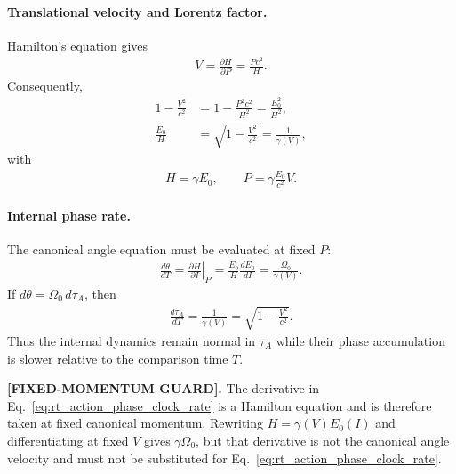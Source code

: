\paragraph{Translational velocity and Lorentz factor.}
Hamilton's equation gives
\begin{align}
    V
    =
    \frac{\partial H}{\partial P}
    =
    \frac{Pc^2}{H}.
    \label{eq:rt_action_phase_velocity}
\end{align}
Consequently,
\begin{align}
    1-\frac{V^2}{c^2}
    &=
    1-\frac{P^2c^2}{H^2}
    =
    \frac{E_0^2}{H^2},
    \\
    \frac{E_0}{H}
    &=
    \sqrt{1-\frac{V^2}{c^2}}
    =
    \frac{1}{\gamma(V)},
    \label{eq:rt_action_phase_e0_over_h}
\end{align}
with
\begin{align}
    H=\gamma E_0,
    \qquad
    P=\gamma\frac{E_0}{c^2}V.
    \label{eq:rt_action_phase_relativistic_relations}
\end{align}

\paragraph{Internal phase rate.}
The canonical angle equation must be evaluated at fixed \(P\):
\begin{align}
    \frac{d\theta}{dT}
    =
    \left.\frac{\partial H}{\partial I}\right|_P
    =
    \frac{E_0}{H}\frac{dE_0}{dI}
    =
    \frac{\Omega_0}{\gamma(V)}.
    \label{eq:rt_action_phase_clock_rate}
\end{align}
If \(d\theta=\Omega_0\,d\tau_A\), then
\begin{align}
    \boxed{
    \frac{d\tau_A}{dT}
    =
    \frac{1}{\gamma(V)}
    =
    \sqrt{1-\frac{V^2}{c^2}}
    }.
    \label{eq:rt_action_phase_proper_time}
\end{align}
Thus the internal dynamics remain normal in \(\tau_A\) while their phase
accumulation is slower relative to the comparison time \(T\).

\textbf{[FIXED-MOMENTUM GUARD].}
The derivative in Eq.~\eqref{eq:rt_action_phase_clock_rate} is a Hamilton equation
and is therefore taken at fixed canonical momentum.  Rewriting
\(H=\gamma(V)E_0(I)\) and differentiating at fixed \(V\) gives
\(\gamma\Omega_0\), but that derivative is not the canonical angle velocity and
must not be substituted for Eq.~\eqref{eq:rt_action_phase_clock_rate}.

